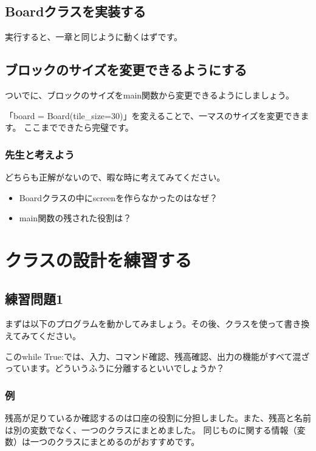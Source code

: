 \subsection{Boardクラスを実装する}

実行すると、一章と同じように動くはずです。

\subsection{ブロックのサイズを変更できるようにする}
ついでに、ブロックのサイズをmain関数から変更できるようにしましょう。


「{board = Board(tile\_size=30)}」を変えることで、一マスのサイズを変更できます。
ここまでできたら完璧です。

\subsubsection{先生と考えよう}
どちらも正解がないので、暇な時に考えてみてください。
\begin{itemize}
  \item Boardクラスの中にscreenを作らなかったのはなぜ？
  \item main関数の残された役割は？
\end{itemize}

\newpage
\section{クラスの設計を練習する}
\subsection{練習問題1}
まずは以下のプログラムを動かしてみましょう。その後、クラスを使って書き換えてみてください。

このwhile True:では、入力、コマンド確認、残高確認、出力の機能がすべて混ざっています。どういうふうに分離するといいでしょうか？
\newpage
\subsubsection{例}

残高が足りているか確認するのは口座の役割に分担しました。また、残高と名前は別の変数でなく、一つのクラスにまとめました。
同じものに関する情報（変数）は一つのクラスにまとめるのがおすすめです。

